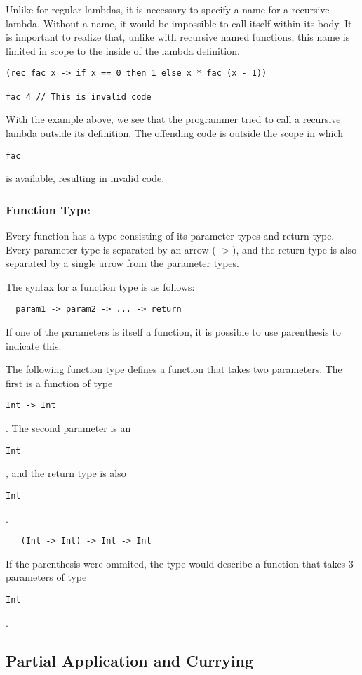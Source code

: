 \documentclass{article}
\def\code#1{\begin{footnotesize}\texttt{#1}\end{footnotesize}}
\begin{document}
Unlike for regular lambdas, it is necessary to specify a name for a recursive lambda.
Without a name, it would be impossible to call itself within its body.
It is important to realize that, unlike with recursive named functions, this name is limited in scope to the inside of the lambda definition.

\begin{lstlisting}
(rec fac x -> if x == 0 then 1 else x * fac (x - 1))

fac 4 // This is invalid code
\end{lstlisting}

With the example above, we see that the programmer tried to call a recursive lambda outside its definition.
The offending code is outside the scope in which \code{fac} is available, resulting in invalid code.

\subsubsection{Function Type}\label{Function Type}

Every function has a type consisting of its parameter types and return type.
Every parameter type is separated by an arrow (-$>$), and the return type is also separated by a single arrow from the parameter types.

The syntax for a function type is as follows:
\begin{lstlisting}
  param1 -> param2 -> ... -> return
\end{lstlisting}

\smallskip

 If one of the parameters is itself a function, it is possible to use parenthesis to indicate this.

The following function type defines a function that takes two parameters.
The first is a function of type \code{Int -> Int}.
The second parameter is an \code{Int}, and the return type is also \code{Int}.

 \begin{lstlisting}
   (Int -> Int) -> Int -> Int
 \end{lstlisting}

If the parenthesis were ommited, the type would describe a function that takes 3 parameters of type \code{Int}.

\subsection{Partial Application and Currying}
\end{document}
